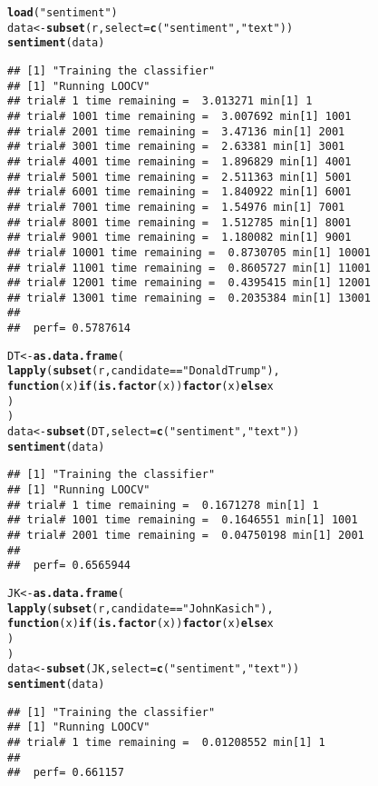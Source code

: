 \documentclass{article}\usepackage[]{graphicx}\usepackage[]{color}
\makeatletter
\newcommand{\hlstr}[1]{\textcolor[rgb]{0.192,0.494,0.8}{#1}}%
\newcommand{\hlopt}[1]{\textcolor[rgb]{0,0,0}{#1}}%
\newcommand{\hlstd}[1]{\textcolor[rgb]{0.345,0.345,0.345}{#1}}%
\newcommand{\hlkwa}[1]{\textcolor[rgb]{0.161,0.373,0.58}{\textbf{#1}}}%
\newcommand{\hlkwb}[1]{\textcolor[rgb]{0.69,0.353,0.396}{#1}}%
\newcommand{\hlkwc}[1]{\textcolor[rgb]{0.333,0.667,0.333}{#1}}%
\newcommand{\hlkwd}[1]{\textcolor[rgb]{0.737,0.353,0.396}{\textbf{#1}}}%
\newenvironment{kframe}{%
 \def\at@end@of@kframe{}%
 \ifinner\ifhmode%
  \def\at@end@of@kframe{\end{minipage}}%
  \begin{minipage}{\columnwidth}%
 \fi\fi%
 \def\FrameCommand##1{\hskip\@totalleftmargin \hskip-\fboxsep
 \colorbox{shadecolor}{##1}\hskip-\fboxsep
     \hskip-\linewidth \hskip-\@totalleftmargin \hskip\columnwidth}%
 \MakeFramed {\advance\hsize-\width
   \@totalleftmargin\z@ \linewidth\hsize
   \@setminipage}}%
 {\par\unskip\endMakeFramed%
 \at@end@of@kframe}
\newenvironment{knitrout}{}{} %
\makeatother
\begin{document}
\begin{enumerate}
\begin{knitrout}
\begin{kframe}
\begin{alltt}
\hlkwd{load}\hlstd{(}\hlstr{"sentiment"}\hlstd{)}
\hlstd{data} \hlkwb{<-} \hlkwd{subset}\hlstd{(r,}\hlkwc{select}\hlstd{=}\hlkwd{c}\hlstd{(}\hlstr{"sentiment"}\hlstd{,}\hlstr{"text"}\hlstd{))}
\hlkwd{sentiment}\hlstd{(data)}
\end{alltt}
\begin{verbatim}
## [1] "Training the classifier"
## [1] "Running LOOCV"
## trial# 1 time remaining =  3.013271 min[1] 1
## trial# 1001 time remaining =  3.007692 min[1] 1001
## trial# 2001 time remaining =  3.47136 min[1] 2001
## trial# 3001 time remaining =  2.63381 min[1] 3001
## trial# 4001 time remaining =  1.896829 min[1] 4001
## trial# 5001 time remaining =  2.511363 min[1] 5001
## trial# 6001 time remaining =  1.840922 min[1] 6001
## trial# 7001 time remaining =  1.54976 min[1] 7001
## trial# 8001 time remaining =  1.512785 min[1] 8001
## trial# 9001 time remaining =  1.180082 min[1] 9001
## trial# 10001 time remaining =  0.8730705 min[1] 10001
## trial# 11001 time remaining =  0.8605727 min[1] 11001
## trial# 12001 time remaining =  0.4395415 min[1] 12001
## trial# 13001 time remaining =  0.2035384 min[1] 13001
## 
##  perf= 0.5787614
\end{verbatim}
\begin{alltt}
\hlstd{DT} \hlkwb{<-} \hlkwd{as.data.frame}\hlstd{(}
  \hlkwd{lapply}\hlstd{(}\hlkwd{subset}\hlstd{(r, candidate}\hlopt{==}\hlstr{"Donald Trump"}\hlstd{),}
         \hlkwa{function}\hlstd{(}\hlkwc{x}\hlstd{)} \hlkwa{if}\hlstd{(}\hlkwd{is.factor}\hlstd{(x))} \hlkwd{factor}\hlstd{(x)} \hlkwa{else} \hlstd{x}
  \hlstd{)}
\hlstd{)}
\hlstd{data} \hlkwb{<-} \hlkwd{subset}\hlstd{(DT,}\hlkwc{select}\hlstd{=}\hlkwd{c}\hlstd{(}\hlstr{"sentiment"}\hlstd{,}\hlstr{"text"}\hlstd{))}
\hlkwd{sentiment}\hlstd{(data)}
\end{alltt}
\begin{verbatim}
## [1] "Training the classifier"
## [1] "Running LOOCV"
## trial# 1 time remaining =  0.1671278 min[1] 1
## trial# 1001 time remaining =  0.1646551 min[1] 1001
## trial# 2001 time remaining =  0.04750198 min[1] 2001
## 
##  perf= 0.6565944
\end{verbatim}
\begin{alltt}
\hlstd{JK} \hlkwb{<-} \hlkwd{as.data.frame}\hlstd{(}
  \hlkwd{lapply}\hlstd{(}\hlkwd{subset}\hlstd{(r, candidate}\hlopt{==}\hlstr{"John Kasich"}\hlstd{),}
         \hlkwa{function}\hlstd{(}\hlkwc{x}\hlstd{)} \hlkwa{if}\hlstd{(}\hlkwd{is.factor}\hlstd{(x))} \hlkwd{factor}\hlstd{(x)} \hlkwa{else} \hlstd{x}
  \hlstd{)}
\hlstd{)}
\hlstd{data} \hlkwb{<-} \hlkwd{subset}\hlstd{(JK,}\hlkwc{select}\hlstd{=}\hlkwd{c}\hlstd{(}\hlstr{"sentiment"}\hlstd{,}\hlstr{"text"}\hlstd{))}
\hlkwd{sentiment}\hlstd{(data)}
\end{alltt}
\begin{verbatim}
## [1] "Training the classifier"
## [1] "Running LOOCV"
## trial# 1 time remaining =  0.01208552 min[1] 1
## 
##  perf= 0.661157
\end{verbatim}
\end{kframe}
\end{knitrout}

\end{enumerate}
\end{document}
